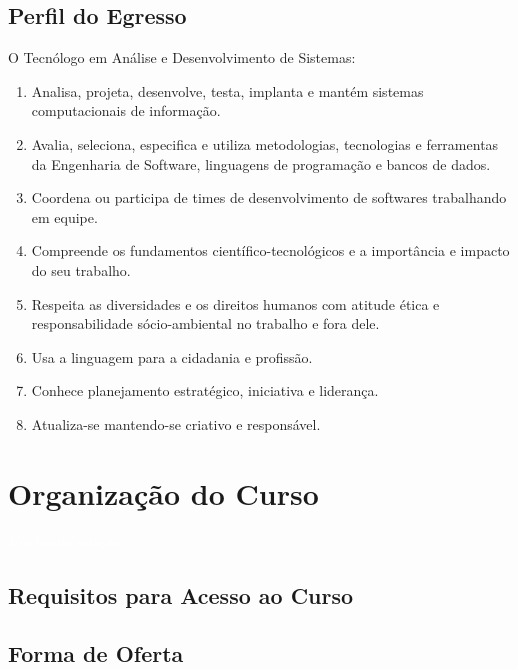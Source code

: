 \documentclass[11pt,fleqn]{book} %
\begin{document}
\section{Perfil do Egresso}
O Tecnólogo em Análise e Desenvolvimento de Sistemas:
\begin{enumerate}
	\item Analisa, projeta, desenvolve, testa, implanta e mantém sistemas computacionais de informação. 
	\item Avalia, seleciona, especifica e utiliza metodologias, tecnologias e ferramentas da Engenharia de Software, linguagens de programação e bancos de dados. 
	\item Coordena ou participa de times de desenvolvimento de softwares trabalhando em equipe.
	\item Compreende os fundamentos científico-tecnológicos e a importância e impacto do seu trabalho.
	\item Respeita as diversidades e os direitos humanos com atitude ética e responsabilidade sócio-ambiental no trabalho e fora dele.
	\item Usa a linguagem para a cidadania e profissão.
	\item Conhece planejamento estratégico, iniciativa e liderança.
	\item Atualiza-se mantendo-se criativo e responsável.
\end{enumerate}

\chapter{Organização do Curso}\label{organizacao}
\vspace{6em}
\begin{flushright}
	\textit{\textcolor{white}{Um bonita citação...}}
\end{flushright}
\vspace{12em}

\section{Requisitos para Acesso ao Curso}


\section{Forma de Oferta}\label{carga}
\end{document}
